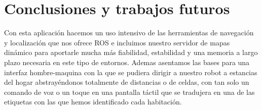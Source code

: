 \chapter{Conclusiones y trabajos futuros}
\label{cap:conclusiones}


Con esta aplicación hacemos un uso intensivo de las herramientas de navegación y localización que nos ofrece ROS e incluimos nuestro servidor de mapas dinámico para aportarle mucha más fiabilidad, estabilidad y una memoria a largo plazo necesaria en este tipo de entornos. Ademas asentamos las bases para una interfaz hombre-maquina con la que se pudiera dirigir a nuestro robot a estancias del hogar abstrayéndonos totalmente de distancias o de celdas, con tan solo un comando de voz o un toque en una pantalla táctil que se tradujera en una de las etiquetas con las que hemos identificado cada habitación.